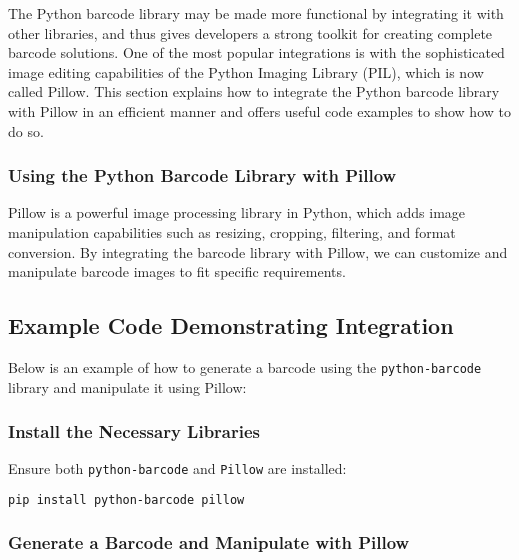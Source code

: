 The Python barcode library may be made more functional by integrating it with other libraries, and thus gives developers a strong toolkit for creating complete barcode solutions. One of the most popular integrations is with the sophisticated image editing capabilities of the Python Imaging Library (PIL), which is now called Pillow. This section explains how to integrate the Python barcode library with Pillow in an efficient manner and offers useful code examples to show how to do so.\\

\subsubsection{Using the Python Barcode Library with Pillow}

Pillow is a powerful image processing library in Python, which adds image manipulation capabilities such as resizing, cropping, filtering, and format conversion. By integrating the barcode library with Pillow, we can customize and manipulate barcode images to fit specific requirements.

\subsection{Example Code Demonstrating Integration}

Below is an example of how to generate a barcode using the \texttt{python-barcode} library and manipulate it using Pillow:

\subsubsection{Install the Necessary Libraries}

Ensure both \texttt{python-barcode} and \texttt{Pillow} are installed:
\begin{lstlisting}[language=bash]
	pip install python-barcode pillow
\end{lstlisting}

\subsubsection{Generate a Barcode and Manipulate with Pillow}

